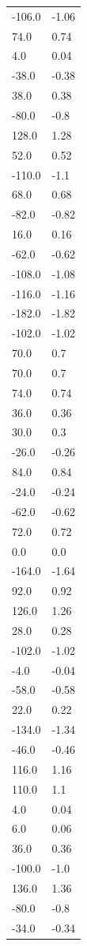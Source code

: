 \begin{longtable}{ll}
-106.0 & -1.06 \\
74.0 & 0.74 \\
4.0 & 0.04 \\
-38.0 & -0.38 \\
38.0 & 0.38 \\
-80.0 & -0.8 \\
128.0 & 1.28 \\
52.0 & 0.52 \\
-110.0 & -1.1 \\
68.0 & 0.68 \\
-82.0 & -0.82 \\
16.0 & 0.16 \\
-62.0 & -0.62 \\
-108.0 & -1.08 \\
-116.0 & -1.16 \\
-182.0 & -1.82 \\
-102.0 & -1.02 \\
70.0 & 0.7 \\
70.0 & 0.7 \\
74.0 & 0.74 \\
36.0 & 0.36 \\
30.0 & 0.3 \\
-26.0 & -0.26 \\
84.0 & 0.84 \\
-24.0 & -0.24 \\
-62.0 & -0.62 \\
72.0 & 0.72 \\
0.0 & 0.0 \\
-164.0 & -1.64 \\
92.0 & 0.92 \\
126.0 & 1.26 \\
28.0 & 0.28 \\
-102.0 & -1.02 \\
-4.0 & -0.04 \\
-58.0 & -0.58 \\
22.0 & 0.22 \\
-134.0 & -1.34 \\
-46.0 & -0.46 \\
116.0 & 1.16 \\
110.0 & 1.1 \\
4.0 & 0.04 \\
6.0 & 0.06 \\
36.0 & 0.36 \\
-100.0 & -1.0 \\
136.0 & 1.36 \\
-80.0 & -0.8 \\
-34.0 & -0.34 \\

\end{longtable}
